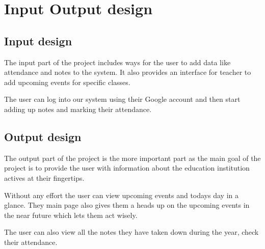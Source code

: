 \section{Input Output design}

\subsection{Input design}

The input part of the project includes ways for the user to add data like attendance and notes to the system. It also provides an interface for teacher to add upcoming events for specific classes.

The user can log into our system using their Google account and then start adding up notes and marking their attendance.

\subsection{Output design}

The output part of the project is the more important part as the main goal of the project is to provide the user with information about the education institution actives at their fingertips.

Without any effort the user can view upcoming events and todays day in a glance. They main page also gives them a heads up on the upcoming events in the near future which lets them act wisely.

The user can also view all the notes they have taken down during the year, check their attendance.
